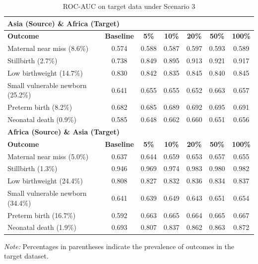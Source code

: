 \documentclass[fleqn,10pt]{wlscirep}
\begin{document}
\begin{table}[htbp]
\centering
\footnotesize
\begin{threeparttable}
\caption{ROC-AUC on target data under Scenario 3}
\label{table:target}
\begin{tabular}{l c c c c c c}
\toprule
\multicolumn{7}{l}{\textbf{Asia (Source) \& Africa (Target)}} \\
\midrule
\textbf{Outcome} & \textbf{Baseline} & \textbf{5\%} & \textbf{10\%} & \textbf{20\%} & \textbf{50\%} & \textbf{100\%} \\
\midrule
Maternal near miss (8.6\%)    & 0.574 & 0.588 & 0.587 & 0.597 & 0.593 & 0.589 \\
Stillbirth (2.7\%)           & 0.738 & 0.849 & 0.895 & 0.913 & 0.921 & 0.917 \\
Low birthweight (14.7\%)     & 0.830 & 0.842 & 0.835 & 0.845 & 0.840 & 0.845 \\
Small vulnerable newborn (25.2\%) & 0.641 & 0.655 & 0.655 & 0.652 & 0.663 & 0.657 \\
Preterm birth (8.2\%)        & 0.682 & 0.685 & 0.689 & 0.692 & 0.695 & 0.691 \\
Neonatal death (0.9\%)       & 0.585 & 0.648 & 0.662 & 0.660 & 0.651 & 0.656 \\
\midrule
\multicolumn{7}{l}{\textbf{Africa (Source) \& Asia (Target)}} \\
\midrule
\textbf{Outcome} & \textbf{Baseline} & \textbf{5\%} & \textbf{10\%} & \textbf{20\%} & \textbf{50\%} & \textbf{100\%} \\
\midrule
Maternal near miss (5.0\%)    & 0.637 & 0.644 & 0.659 & 0.653 & 0.657 & 0.655 \\
Stillbirth (1.3\%)           & 0.946 & 0.969 & 0.974 & 0.983 & 0.980 & 0.982 \\
Low birthweight (24.4\%)     & 0.808 & 0.827 & 0.832 & 0.836 & 0.834 & 0.837 \\
Small vulnerable newborn (34.4\%) & 0.641 & 0.639 & 0.649 & 0.643 & 0.651 & 0.654 \\
Preterm birth (16.7\%)       & 0.592 & 0.663 & 0.665 & 0.664 & 0.665 & 0.667 \\
Neonatal death (1.9\%)       & 0.693 & 0.807 & 0.837 & 0.862 & 0.863 & 0.872 \\
\bottomrule
\end{tabular}
\begin{tablenotes}
\scriptsize
\item \textit{Note:} Percentages in parentheses indicate the prevalence of outcomes in the target dataset.
\end{tablenotes}
\end{threeparttable}
\end{table}
\end{document}
